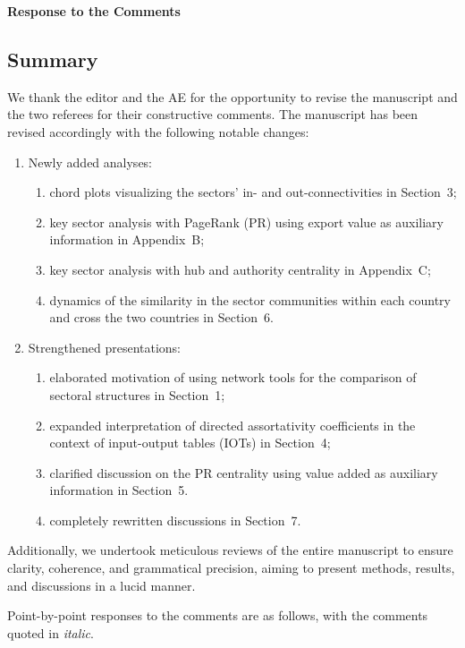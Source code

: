 \documentclass[12pt]{article}
\newcommand{\jy}[1]{\textcolor{red}{JY: #1}}
\begin{document}
\begin{center}
  {\Large\bf Response to the Comments}
\end{center}



\subsection*{Summary}

We thank the editor and the AE for the opportunity to revise the manuscript and
the two referees for their constructive comments. The manuscript has been
revised accordingly with the following notable changes:
\begin{enumerate}
\item Newly added analyses:
  \begin{enumerate}
    \item chord plots visualizing the sectors' in- and out-connectivities in
      Section~3;
    \item key sector analysis with PageRank (PR) using export value as auxiliary
      information in Appendix~B;
    \item key sector analysis with hub and authority centrality in Appendix~C;
    \item dynamics of the similarity in the sector communities within each
      country and cross the two countries in Section~6.
    \end{enumerate}
\item Strengthened presentations:
  \begin{enumerate}
  \item elaborated motivation of using network tools for the comparison of
    sectoral structures in Section~1;
  \item expanded interpretation of directed assortativity coefficients in the
    context of input-output tables (IOTs) in Section~4;
  \item clarified discussion on the PR centrality using value added as
    auxiliary information in Section~5.
  \item completely rewritten discussions in Section~7.
  \end{enumerate}
\end{enumerate}
Additionally, we undertook meticulous reviews of the entire manuscript to ensure
clarity, coherence, and grammatical precision, aiming to present methods,
results, and discussions in a lucid manner.


Point-by-point responses to the comments are as follows, with the
comments quoted in \emph{\color{darkblue} italic}.
\end{document}
